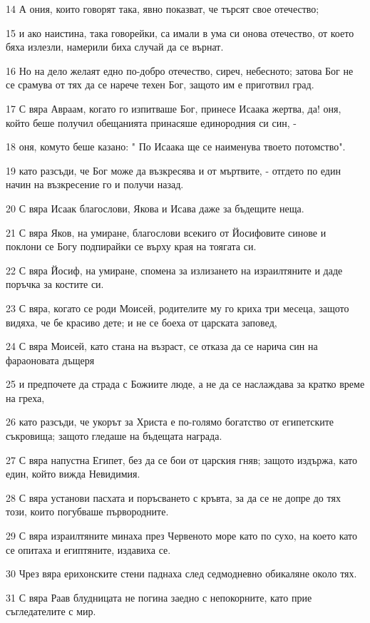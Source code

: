 \par 14 А ония, които говорят така, явно показват, че търсят свое отечество;
\par 15 и ако наистина, така говорейки, са имали в ума си онова отечество, от което бяха излезли, намерили биха случай да се върнат.
\par 16 Но на дело желаят едно по-добро отечество, сиреч, небесното; затова Бог не се срамува от тях да се нарече техен Бог, защото им е приготвил град.
\par 17 С вяра Авраам, когато го изпитваше Бог, принесе Исаака жертва, да! оня, който беше получил обещанията принасяше единородния си син, -
\par 18 оня, комуто беше казано: " По Исаака ще се наименува твоето потомство".
\par 19 като разсъди, че Бог може да възкресява и от мъртвите, - отгдето по един начин на възкресение го и получи назад.
\par 20 С вяра Исаак благослови, Якова и Исава даже за бъдещите неща.
\par 21 С вяра Яков, на умиране, благослови всекиго от Йосифовите синове и поклони се Богу подпирайки се върху края на тоягата си.
\par 22 С вяра Йосиф, на умиране, спомена за излизането на израилтяните и даде поръчка за костите си.
\par 23 С вяра, когато се роди Моисей, родителите му го криха три месеца, защото видяха, че бе красиво дете; и не се боеха от царската заповед,
\par 24 С вяра Моисей, като стана на възраст, се отказа да се нарича син на фараоновата дъщеря
\par 25 и предпочете да страда с Божиите люде, а не да се наслаждава за кратко време на греха,
\par 26 като разсъди, че укорът за Христа е по-голямо богатство от египетските съкровища; защото гледаше на бъдещата награда.
\par 27 С вяра напустна Египет, без да се бои от царския гняв; защото издържа, като един, който вижда Невидимия.
\par 28 С вяра установи пасхата и поръсването с кръвта, за да се не допре до тях този, които погубваше първородните.
\par 29 С вяра израилтяните минаха през Червеното море като по сухо, на което като се опитаха и египтяните, издавиха се.
\par 30 Чрез вяра ерихонските стени паднаха след седмодневно обикаляне около тях.
\par 31 С вяра Раав блудницата не погина заедно с непокорните, като прие съгледателите с мир.

